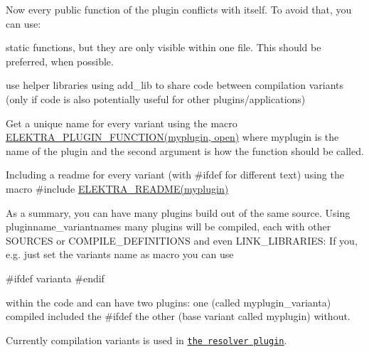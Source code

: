 Now every public function of the plugin conflicts with itself. To avoid that, you can use\+:
\begin{DoxyItemize}
\item static functions, but they are only visible within one file. This should be preferred, when possible.
\item use helper libraries using add\+\_\+lib to share code between compilation variants (only if code is also potentially useful for other plugins/applications)
\item Get a unique name for every variant using the macro {\ttfamily \hyperlink{group__plugin_ga34d1a66f0a6e89cfd20f4014a9975a2a}{E\+L\+E\+K\+T\+R\+A\+\_\+\+P\+L\+U\+G\+I\+N\+\_\+\+F\+U\+N\+C\+T\+I\+O\+N(myplugin, open)}} where myplugin is the name of the plugin and the second argument is how the function should be called.
\item Including a readme for every variant (with \#ifdef for different text) using the macro {\ttfamily \#include \hyperlink{group__plugin_ga78d616f68bf9fb0942f66478597467c6}{E\+L\+E\+K\+T\+R\+A\+\_\+\+R\+E\+A\+D\+M\+E(myplugin)}}
\end{DoxyItemize}

As a summary, you can have many plugins build out of the same source. Using pluginname\+\_\+variantnames many plugins will be compiled, each with other S\+O\+U\+R\+C\+E\+S or {\ttfamily C\+O\+M\+P\+I\+L\+E\+\_\+\+D\+E\+F\+I\+N\+I\+T\+I\+O\+N\+S} and even {\ttfamily L\+I\+N\+K\+\_\+\+L\+I\+B\+R\+A\+R\+I\+E\+S}\+: If you, e.\+g. just set the variants name as macro you can use \begin{DoxyVerb}    #ifdef varianta
    #endif
\end{DoxyVerb}


within the code and can have two plugins\+: one (called myplugin\+\_\+varianta) compiled included the {\ttfamily \#ifdef} the other (base variant called myplugin) without.

Currently compilation variants is used in \href{http://libelektra.org/tree/master/src/plugins/resolver/resolver.c}{\tt the resolver plugin}. 